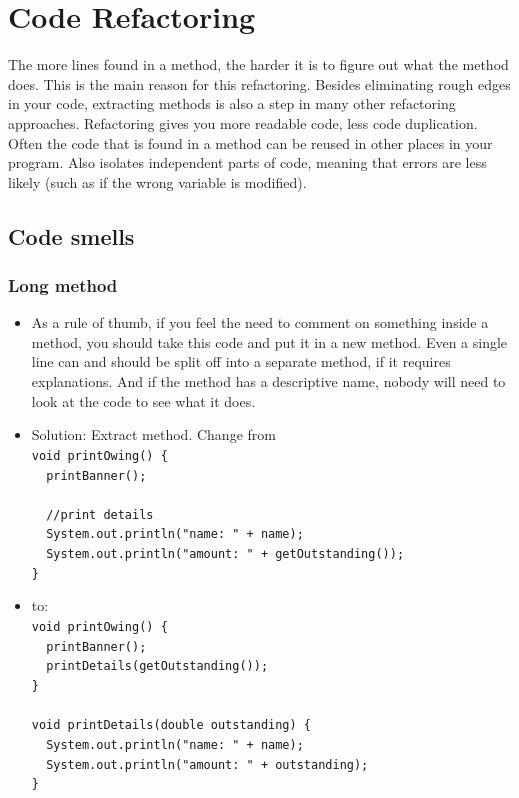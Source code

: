 \documentclass{article}
\begin{document}
\section{Code Refactoring}
The more lines found in a method, the harder it is to figure out what the method does. This is the main reason for this refactoring. Besides eliminating rough edges in your code, extracting methods is also a step in many other refactoring approaches. Refactoring gives you more readable code, less code duplication. Often the code that is found in a method can be reused in other places in your program. Also isolates independent parts of code, meaning that errors are less likely (such as if the wrong variable is modified).
\subsection{Code smells}
\subsubsection{Long method}
\begin{itemize}
    \item As a rule of thumb, if you feel the need to comment on something inside a method, you should take this code and put it in a new method. Even a single line can and should be split off into a separate method, if it requires explanations. And if the method has a descriptive name, nobody will need to look at the code to see what it does.
    \item Solution: Extract method. Change from\\
        \lstinline|void printOwing() {|\\
        \lstinline|  printBanner();|\\\\
        \lstinline|  //print details|\\
        \lstinline|  System.out.println("name: " + name);|\\
        \lstinline|  System.out.println("amount: " + getOutstanding());|\\
        \lstinline|}|
    \item to:\\
        \lstinline|void printOwing() {|\\
        \lstinline|  printBanner();|\\
        \lstinline|  printDetails(getOutstanding());|\\
        \lstinline|}|\\
        \lstinline||\\
        \lstinline|void printDetails(double outstanding) {|\\
        \lstinline|  System.out.println("name: " + name);|\\
        \lstinline|  System.out.println("amount: " + outstanding);|\\
        \lstinline|}|
\end{itemize}
\end{document}
